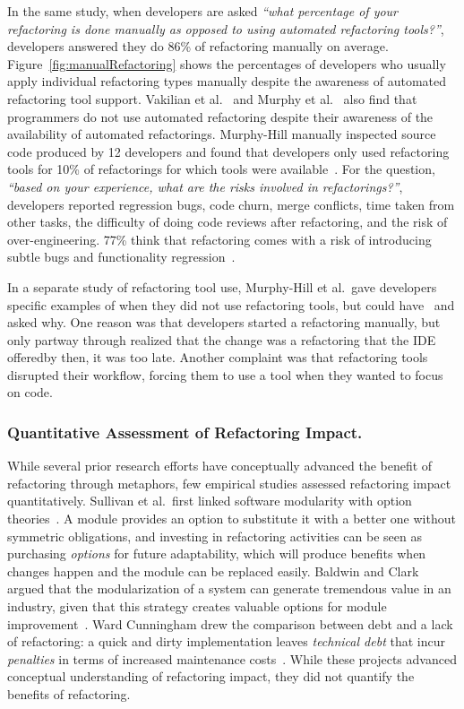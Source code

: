 In the same study, when developers are asked {\it ``what percentage of your refactoring is done manually as opposed to using automated refactoring tools?''}, developers answered they do 86\% of refactoring manually on average. Figure~\ref{fig:manualRefactoring} shows the percentages of developers who usually apply individual refactoring types manually despite the awareness of automated refactoring tool support. Vakilian et al.~\cite{Vakilian:2012} and Murphy et al.~\cite{Murphy2006:JSD} also find that programmers do not use automated refactoring despite their awareness of the availability of automated refactorings. Murphy-Hill manually inspected source code produced by 12 developers and found that developers only used refactoring tools for 10\% of refactorings for which tools were available~\cite{Murphy-Hill2012:refactor}. For the question, {\it ``based on your experience, what are the risks involved in refactorings?''}, developers reported regression bugs, code churn, merge conflicts, time taken from other tasks, the difficulty of doing code reviews after refactoring, and the risk of over-engineering. 77\% think that refactoring comes with a risk of introducing subtle bugs and functionality regression~\cite{Kim2012:FSR}.

In a separate study of refactoring tool use, Murphy-Hill et al.~gave developers specific examples of when they did not use refactoring tools, but could have~\cite{Murphy-Hill2012:refactor} and asked why. One reason was that developers started a refactoring manually, but only partway through realized that the change was a refactoring that the IDE offered\textemdash by then, it was too late.  Another complaint was that refactoring tools disrupted their workflow, forcing them to use a tool when they wanted to focus on code.  

\subsubsection{Quantitative Assessment of Refactoring Impact.} 
\label{sec:refactoringassessment} 
While several prior research efforts have conceptually advanced the benefit of refactoring through metaphors, few empirical studies assessed refactoring impact quantitatively. Sullivan et al.~first linked software modularity with option theories~\cite{Sullivan1998:option}. A module provides an option to substitute it with a better one without symmetric obligations, and investing in refactoring activities can be seen as purchasing \emph{options} for future adaptability, which will produce benefits when changes happen and the module can be replaced easily. Baldwin and Clark argued that the modularization of a system can generate tremendous value in an industry, given that this strategy creates valuable options for module improvement~\cite{Baldwin1999:designrule}. Ward Cunningham drew the comparison between debt and a lack of refactoring: a quick and dirty implementation leaves {\em technical debt} that incur \emph{penalties} in terms of increased maintenance costs~\cite{Cunningham1992:td}. While these projects advanced conceptual understanding of refactoring impact, they did not quantify the benefits of refactoring.  

